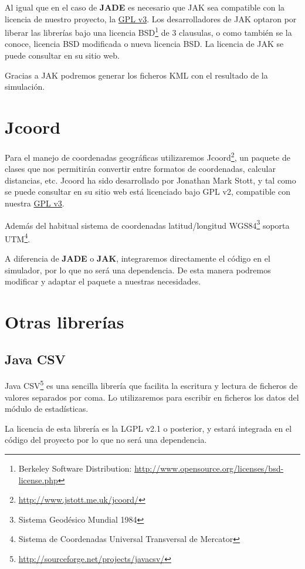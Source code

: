 Al igual que en el caso de {\bf JADE} es necesario que JAK sea compatible con
la licencia de nuestro proyecto, la \hyperref[ap1]{GPL v3}.
Los desarrolladores de JAK optaron por liberar las librerías bajo una licencia
BSD\footnote{Berkeley Software Distribution:
\url{http://www.opensource.org/licenses/bsd-license.php}} de 3 clausulas, o como
también se la conoce, licencia BSD modificada o nueva licencia BSD. La licencia
de JAK se puede consultar en su sitio web.

Gracias a JAK podremos generar los ficheros KML con el resultado de la
simulación.

\section*{Jcoord}

Para el manejo de coordenadas geográficas utilizaremos
Jcoord\footnote{\url{http://www.jstott.me.uk/jcoord/}}, un paquete de clases que
nos permitirán convertir entre formatos de coordenadas, calcular distancias,
etc. Jcoord ha sido desarrollado por Jonathan Mark Stott, y tal como se puede
consultar en su sitio web está licenciado bajo GPL v2, compatible con nuestra
\hyperref[ap1]{GPL v3}.

Además del habitual sistema de coordenadas latitud/longitud
WGS84\footnote{Sistema Geodésico Mundial 1984} soporta UTM\footnote{Sistema de
Coordenadas Universal Transversal de Mercator}.

A diferencia de {\bf JADE} o {\bf JAK}, integraremos directamente el código en
el simulador, por lo que no será una dependencia. De esta manera podremos
modificar y adaptar el paquete a nuestras necesidades.

\section*{Otras librerías}

\subsection*{Java CSV}

Java CSV\footnote{\url{http://sourceforge.net/projects/javacsv/}} es una
sencilla librería que facilita la escritura y lectura de ficheros de valores
separados por coma. Lo utilizaremos para escribir en ficheros los datos del
módulo de estadísticas.

La licencia de esta librería es la LGPL v2.1 o posterior, y estará integrada en
el código del proyecto por lo que no será una dependencia.

